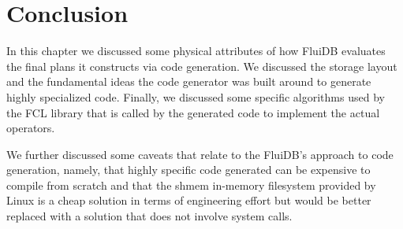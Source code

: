 \section{Conclusion}

In this chapter we discussed some physical attributes of how FluiDB
evaluates the final plans it constructs via code generation. We
discussed the storage layout and the fundamental ideas the code
generator was built around to generate highly specialized
code. Finally, we discussed some specific algorithms used by the FCL
library that is called by the generated code to implement the actual
operators.

We further discussed some caveats that relate to the FluiDB's
approach to code generation, namely, that highly specific code
generated can be expensive to compile from scratch and that the shmem
in-memory filesystem provided by Linux is a cheap solution in terms of
engineering effort but would be better replaced with a solution that
does not involve system calls.

